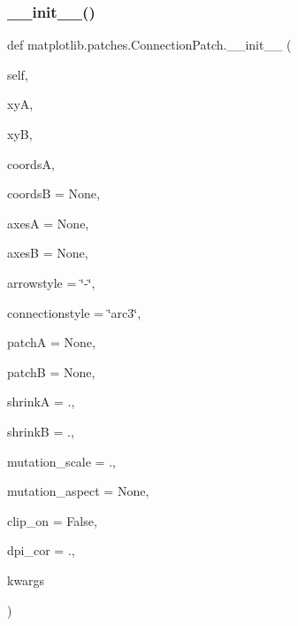 \subsubsection{\texorpdfstring{\+\_\+\+\_\+init\+\_\+\+\_\+()}{\_\_init\_\_()}}
{\footnotesize\ttfamily def matplotlib.\+patches.\+Connection\+Patch.\+\_\+\+\_\+init\+\_\+\+\_\+ (\begin{DoxyParamCaption}\item[{}]{self,  }\item[{}]{xyA,  }\item[{}]{xyB,  }\item[{}]{coordsA,  }\item[{}]{coordsB = {\ttfamily None},  }\item[{}]{axesA = {\ttfamily None},  }\item[{}]{axesB = {\ttfamily None},  }\item[{}]{arrowstyle = {\ttfamily \char`\"{}-\/\char`\"{}},  }\item[{}]{connectionstyle = {\ttfamily \char`\"{}arc3\char`\"{}},  }\item[{}]{patchA = {\ttfamily None},  }\item[{}]{patchB = {\ttfamily None},  }\item[{}]{shrinkA = {.},  }\item[{}]{shrinkB = {.},  }\item[{}]{mutation\+\_\+scale = {.},  }\item[{}]{mutation\+\_\+aspect = {\ttfamily None},  }\item[{}]{clip\+\_\+on = {\ttfamily False},  }\item[{}]{dpi\+\_\+cor = {.},  }\item[{}]{kwargs }\end{DoxyParamCaption})}


